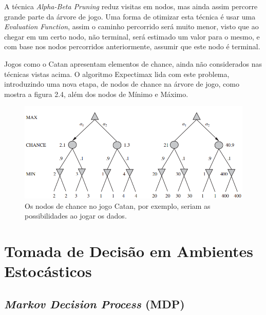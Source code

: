 A técnica \textit{Alpha-Beta Pruning} reduz visitas em nodos, mas ainda assim percorre grande parte da árvore de jogo. Uma forma de otimizar esta técnica é usar uma \textit{Evaluation Function}, assim o caminho percorrido será muito menor, visto que ao chegar em um certo nodo, não terminal, será estimado um valor para o mesmo, e com base nos nodos percorridos anteriormente, assumir que este nodo é terminal.

Jogos como o Catan apresentam elementos de chance, ainda não considerados nas técnicas vistas acima. O algoritmo Expectimax lida com este problema, introduzindo uma nova etapa, de nodos de chance na árvore de jogo, como mostra a figura 2.4, além dos nodos de Mínimo e Máximo.

    \begin{figure}[H]
      \centering
      \includegraphics[width=1\textwidth]{expectimax-fig1.PNG}
      \caption{Os nodos de chance no jogo Catan, por exemplo, seriam as possibilidades ao jogar os dados.~\cite[Cap 5, pp177-180]{AIMA}}
    \end{figure}




\section{\label{sec:secao4}Tomada de Decisão em Ambientes Estocásticos}

\subsection{\label{sec:secao4.1}\textit{Markov Decision Process} (MDP)}

